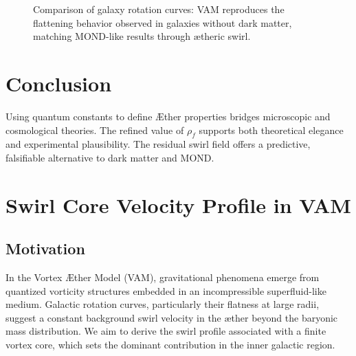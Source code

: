 \documentclass[12pt]{article}
\begin{document}
    \begin{figure}[h]
        \centering
        \caption{Comparison of galaxy rotation curves: VAM reproduces the flattening behavior observed in galaxies without dark matter, matching MOND-like results through ætheric swirl.}
    \end{figure}


    \section{Conclusion}

    Using quantum constants to define \AE{}ther properties bridges microscopic and cosmological theories. The refined value of $\rho_{\!f}$ supports both theoretical elegance and experimental plausibility. The residual swirl field offers a predictive, falsifiable alternative to dark matter and MOND.


\section{Swirl Core Velocity Profile in VAM}
\label{appendix:swirl-core}

\subsection{Motivation}

In the Vortex \AE{}ther Model (VAM), gravitational phenomena emerge from quantized vorticity structures embedded in an incompressible superfluid-like medium. Galactic rotation curves, particularly their flatness at large radii, suggest a constant background swirl velocity in the æther beyond the baryonic mass distribution. We aim to derive the swirl profile associated with a finite vortex core, which sets the dominant contribution in the inner galactic region.
\end{document}
